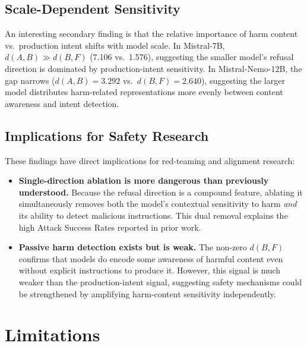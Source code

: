 \documentclass[12pt]{article}
\begin{document}
\subsection{Scale-Dependent Sensitivity}

An interesting secondary finding is that the relative importance of harm content vs.\ production intent shifts with model scale. In Mistral-7B, $d(A,B) \gg d(B,F)$ (7.106 vs.\ 1.576), suggesting the smaller model's refusal direction is dominated by production-intent sensitivity. In Mistral-Nemo-12B, the gap narrows ($d(A,B)=3.292$ vs.\ $d(B,F)=2.640$), suggesting the larger model distributes harm-related representations more evenly between content awareness and intent detection.

\subsection{Implications for Safety Research}

These findings have direct implications for red-teaming and alignment research:

\begin{itemize}
    \item \textbf{Single-direction ablation is more dangerous than previously understood.} Because the refusal direction is a compound feature, ablating it simultaneously removes both the model's contextual sensitivity to harm \textit{and} its ability to detect malicious instructions. This dual removal explains the high Attack Success Rates reported in prior work.
    
    \item \textbf{Passive harm detection exists but is weak.} The non-zero $d(B,F)$ confirms that models do encode some awareness of harmful content even without explicit instructions to produce it. However, this signal is much weaker than the production-intent signal, suggesting safety mechanisms could be strengthened by amplifying harm-content sensitivity independently.
\end{itemize}

\section{Limitations}
\end{document}
